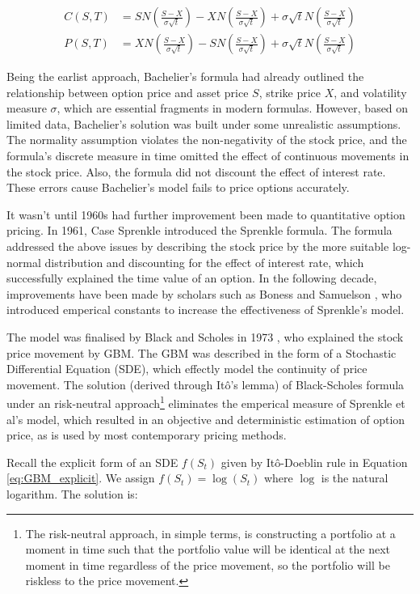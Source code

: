 \begin{align*}
C(S, T) &= SN(\frac{S - X}{\sigma\sqrt{t}}) - XN(\frac{S - X}{\sigma \sqrt{t}}) + \sigma\sqrt{t}N(\frac{S - X}{\sigma \sqrt{t}}) \\
P(S, T) &= XN(\frac{S - X}{\sigma \sqrt{t}}) - SN(\frac{S - X}{\sigma \sqrt{t}}) + \sigma\sqrt{t}N(\frac{S - X}{\sigma \sqrt{t}})
\end{align*}

Being the earlist approach, Bachelier's formula had already outlined the relationship between option price and asset price $S$, strike price $X$, and volatility measure $\sigma$, which are essential fragments in modern formulas. However, based on limited data, Bachelier's solution was built under some unrealistic assumptions. The normality assumption violates the non-negativity of the stock price, and the formula's discrete measure in time omitted the effect of continuous movements in the stock price. Also, the formula did not discount the effect of interest rate. These errors cause Bachelier's model fails to price options accurately.

It wasn't until 1960s had further improvement been made to quantitative option pricing. In 1961, Case Sprenkle \cite{Sprenkle1961} introduced the Sprenkle formula. The formula addressed the above issues by describing the stock price by the more suitable log-normal distribution and discounting for the effect of interest rate, which successfully explained the time value of an option. In the following decade, improvements have been made by scholars such as Boness and Samuelson \cite{BS1973}, who introduced emperical constants to increase the effectiveness of Sprenkle's model.

The model was finalised by Black and Scholes in 1973 \cite{BS1973}, who explained the stock price movement by GBM. The GBM was described in the form of a Stochastic Differential Equation (SDE), which effectly model the continuity of price movement. The solution (derived through Itô's lemma) of Black-Scholes formula under an risk-neutral approach\footnote{The risk-neutral approach, in simple terms, is constructing a portfolio at a moment in time such that the portfolio value will be identical at the next moment in time regardless of the price movement, so the portfolio will be riskless to the price movement.} eliminates the emperical measure of Sprenkle et al's model, which resulted in an objective and deterministic estimation of option price, as is used by most contemporary pricing methods.

Recall the explicit form of an SDE $f(S_t)$ given by Itô-Doeblin rule in Equation \ref{eq:GBM_explicit}. We assign $f(S_t)=\log(S_t)$ where $\log$ is the natural logarithm. The solution is:

